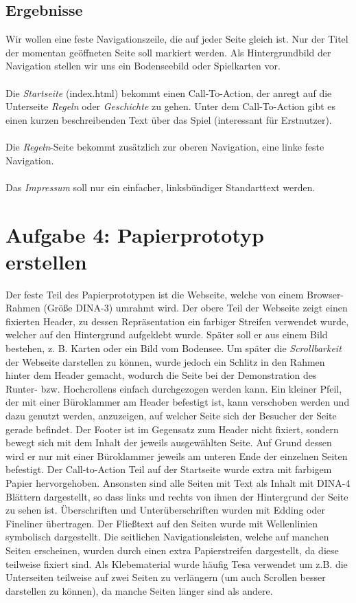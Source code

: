 \documentclass{scrartcl}
\begin{document}
\subsection*{Ergebnisse}
 Wir wollen eine feste Navigationszeile, die auf jeder Seite gleich ist. Nur der Titel der momentan geöffneten Seite soll markiert werden.
 Als Hintergrundbild der Navigation stellen wir uns ein Bodenseebild oder Spielkarten vor. \\
 \\ 
 Die \textit{Startseite} (index.html) bekommt einen Call-To-Action, der anregt auf die Unterseite \textit{Regeln} oder \textit{Geschichte} zu gehen. Unter dem Call-To-Action gibt es einen kurzen beschreibenden Text über das Spiel (interessant für Erstnutzer). \\ \\
Die \textit{Regeln}-Seite bekommt zusätzlich zur oberen Navigation, eine linke feste Navigation. 
   \\  \\
  Das \textit{Impressum} soll nur ein einfacher, linksbündiger Standarttext werden.
\section*{Aufgabe 4: Papierprototyp erstellen}
Der feste Teil des Papierprototypen ist die Webseite, welche von einem Browser-Rahmen (Größe DINA-3) umrahmt wird. Der obere Teil der Webseite zeigt einen fixierten Header, zu dessen Repräsentation ein farbiger Streifen verwendet wurde, welcher auf den Hintergrund aufgeklebt wurde. Später soll er aus einem Bild bestehen, z. B. Karten oder ein Bild vom Bodensee. Um später die \textit{Scrollbarkeit} der Webseite darstellen zu können, wurde jedoch ein Schlitz in den Rahmen hinter dem Header gemacht, wodurch die Seite bei der Demonstration des Runter- bzw. Hochcrollens einfach durchgezogen werden kann. Ein kleiner Pfeil, der mit einer Büroklammer am Header befestigt ist, kann verschoben werden und dazu genutzt werden, anzuzeigen, auf welcher Seite sich der Besucher der Seite gerade befindet. Der Footer ist im Gegensatz zum Header nicht fixiert, sondern bewegt sich mit dem Inhalt der jeweils ausgewählten Seite. Auf Grund dessen wird er nur mit einer Büroklammer jeweils am unteren Ende der einzelnen Seiten befestigt. Der \glqq Call-to-Action\grqq{} Teil auf der Startseite wurde extra mit farbigem Papier hervorgehoben. Ansonsten sind alle Seiten mit Text als Inhalt mit DINA-4 Blättern dargestellt, so dass links und rechts von ihnen der Hintergrund der Seite zu sehen ist.
Überschriften und Unterüberschriften wurden mit Edding oder Fineliner übertragen. Der Fließtext auf den Seiten wurde mit Wellenlinien symbolisch dargestellt. Die seitlichen Navigationsleisten, welche auf manchen Seiten erscheinen, wurden durch einen extra Papierstreifen dargestellt, da diese teilweise fixiert sind. Als Klebematerial wurde häufig Tesa verwendet um z.B. die Unterseiten teilweise auf zwei Seiten zu verlängern (um auch Scrollen besser darstellen zu können), da manche Seiten länger sind als andere.
\end{document}

